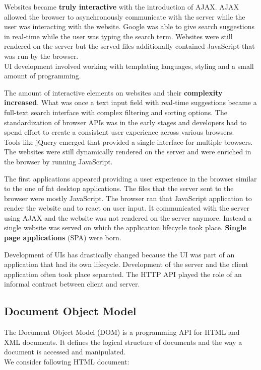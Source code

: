 Websites became \textbf{truly interactive} with the introduction of AJAX. AJAX allowed the browser to asynchronously communicate with the server while the user was interacting with the website. Google was able to give search suggestions in real-time while the user was typing the search term. Websites were still rendered on the server but the served files additionally contained JavaScript that was run by the browser.
\\ UI development involved working with templating languages, styling and a small amount of programming.

The amount of interactive elements on websites and their \textbf{complexity increased}. What was once a text input field with real-time suggestions became a full-text search interface with complex filtering and sorting options. The standardization of browser APIs was in the early stages and developers had to spend effort to create a consistent user experience across various browsers.
\\ Tools like jQuery emerged that provided a single interface for multiple browsers. The websites were still dynamically rendered on the server and were enriched in the browser by running JavaScript.

The first applications appeared providing a user experience in the browser similar to the one of fat desktop applications. The files that the server sent to the browser were mostly JavaScript. The browser ran that JavaScript application to render the website and to react on user input. It communicated with the server using AJAX and the website was not rendered on the server anymore. Instead a single website was served on which the application lifecycle took place. \textbf{Single page applications} (SPA) were born.
\par Development of UIs has drastically changed because the UI was part of an application that had its own lifecycle. Development of the server and the client application often took place separated. The HTTP API played the role of an informal contract between client and server.

\subsection{Document Object Model}\label{documentobjectmodel}
The Document Object Model (DOM) is a programming API for HTML and XML documents. It defines the logical structure of documents and the way a document is accessed and manipulated. \citep{domintro} \\ We consider following HTML document:

